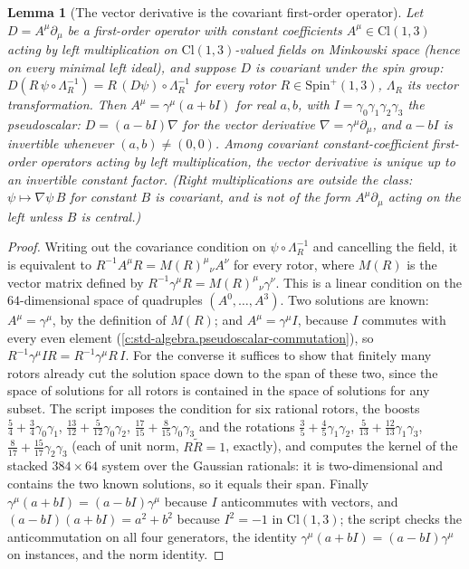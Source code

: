 \documentclass[11pt]{article}
\newtheorem{lemma}[theorem]{Lemma}
\theoremstyle{definition}
\theoremstyle{plain}
\providecommand{\Cl}{}\renewcommand{\Cl}{\mathrm{Cl}}
\begin{document}
\begin{lemma}[The vector derivative is the covariant first-order operator]\label{c:one-relation.vector-derivative-covariant-first-order-operator}
Let $D = A^{\mu}\partial_{\mu}$ be a first-order operator with constant coefficients $A^{\mu} \in \Cl(1,3)$ acting by left multiplication on $\Cl(1,3)$-valued fields on Minkowski space (hence on every minimal left ideal), and suppose $D$ is covariant under the spin group: $D(R\,\psi\circ\Lambda_{R}^{-1}) = R\,(D\psi)\circ\Lambda_{R}^{-1}$ for every rotor $R \in \mathrm{Spin}^{+}(1,3)$, $\Lambda_{R}$ its vector transformation. Then $A^{\mu} = \gamma^{\mu}(a + bI)$ for real $a, b$, with $I = \gamma_{0}\gamma_{1}\gamma_{2}\gamma_{3}$ the pseudoscalar: $D = (a - bI)\nabla$ for the vector derivative $\nabla = \gamma^{\mu}\partial_{\mu}$, and $a - bI$ is invertible whenever $(a,b) \neq (0,0)$. Among covariant constant-coefficient first-order operators acting by left multiplication, the vector derivative is unique up to an invertible constant factor. (Right multiplications are outside the class: $\psi \mapsto \nabla\psi\,B$ for constant $B$ is covariant, and is not of the form $A^{\mu}\partial_{\mu}$ acting on the left unless $B$ is central.)
\end{lemma}
\begin{proof}
Writing out the covariance condition on $\psi \circ \Lambda_{R}^{-1}$ and cancelling the field, it is equivalent to $R^{-1}A^{\mu}R = M(R)^{\mu}{}_{\nu}A^{\nu}$ for every rotor, where $M(R)$ is the vector matrix defined by $R^{-1}\gamma^{\mu}R = M(R)^{\mu}{}_{\nu}\gamma^{\nu}$. This is a linear condition on the $64$-dimensional space of quadruples $(A^{0}, \dots, A^{3})$. Two solutions are known: $A^{\mu} = \gamma^{\mu}$, by the definition of $M(R)$; and $A^{\mu} = \gamma^{\mu}I$, because $I$ commutes with every even element (\ref{c:std-algebra.pseudoscalar-commutation}), so $R^{-1}\gamma^{\mu}IR = R^{-1}\gamma^{\mu}R\,I$. For the converse it suffices to show that finitely many rotors already cut the solution space down to the span of these two, since the space of solutions for all rotors is contained in the space of solutions for any subset. The script imposes the condition for six rational rotors, the boosts $\tfrac54 + \tfrac34\gamma_{0}\gamma_{1}$, $\tfrac{13}{12} + \tfrac{5}{12}\gamma_{0}\gamma_{2}$, $\tfrac{17}{15} + \tfrac{8}{15}\gamma_{0}\gamma_{3}$ and the rotations $\tfrac35 + \tfrac45\gamma_{1}\gamma_{2}$, $\tfrac{5}{13} + \tfrac{12}{13}\gamma_{1}\gamma_{3}$, $\tfrac{8}{17} + \tfrac{15}{17}\gamma_{2}\gamma_{3}$ (each of unit norm, $R\tilde{R} = 1$, exactly), and computes the kernel of the stacked $384 \times 64$ system over the Gaussian rationals: it is two-dimensional and contains the two known solutions, so it equals their span. Finally $\gamma^{\mu}(a + bI) = (a - bI)\gamma^{\mu}$ because $I$ anticommutes with vectors, and $(a - bI)(a + bI) = a^{2} + b^{2}$ because $I^{2} = -1$ in $\Cl(1,3)$; the script checks the anticommutation on all four generators, the identity $\gamma^{\mu}(a+bI) = (a-bI)\gamma^{\mu}$ on instances, and the norm identity.

\end{proof}
\end{document}
